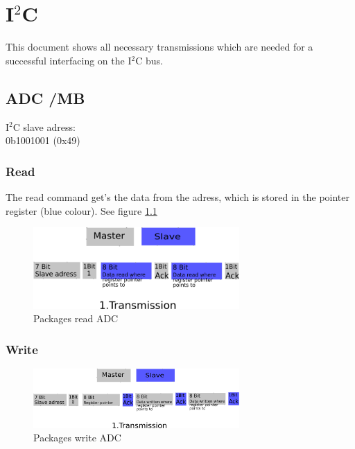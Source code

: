 \chapter{I$^2$C}
\label{chap:I2C}

This document shows all necessary transmissions which are needed for a successful interfacing on the I$^2$C bus. 

\section{ADC /MB}
\label{sec:ADC}

I$^2$C slave adress:\\
0b1001001 (0x49)

\subsection{Read}
\label{subsec:ADCread}

The read command get's the data from the adress, which is stored in the pointer register (blue colour). See figure \ref{fig:ADC1}

\begin{figure}[H]
	\centering\includegraphics[width=0.7\textwidth]{fig/ADC_read}
	\caption{Packages read ADC}
	\label{fig:ADC1}
\end{figure}


\subsection{Write}
\label{subsec:ADCwrite}



\begin{figure}[H]
	\centering\includegraphics[width=0.7\textwidth]{fig/ADC_write}
	\caption{Packages write ADC}
	\label{fig:ADC2}
\end{figure}

